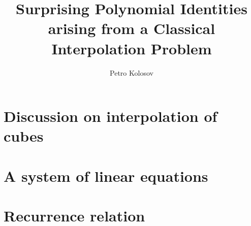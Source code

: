 \documentclass[12pt,letterpaper,oneside,reqno]{amsart}
\title[Surprising Polynomial Identities arising from a Classical Interpolation Problem]
{Surprising Polynomial Identities arising from a Classical Interpolation Problem}
\author[Petro Kolosov]{Petro Kolosov}
\begin{document}
    \maketitle

%        




    \section{Discussion on interpolation of cubes}
    \label{sec:the-problem-of-interpolation-of-cubes}
    

    \section{A system of linear equations}
    \label{sec:system-of-linear-equations-approach}
    

    \section{Recurrence relation}
    \label{sec:recurrence-relation-approach}
    
%
%
%    
%
%
%    
%
%
%    
%
%    
\end{document}
